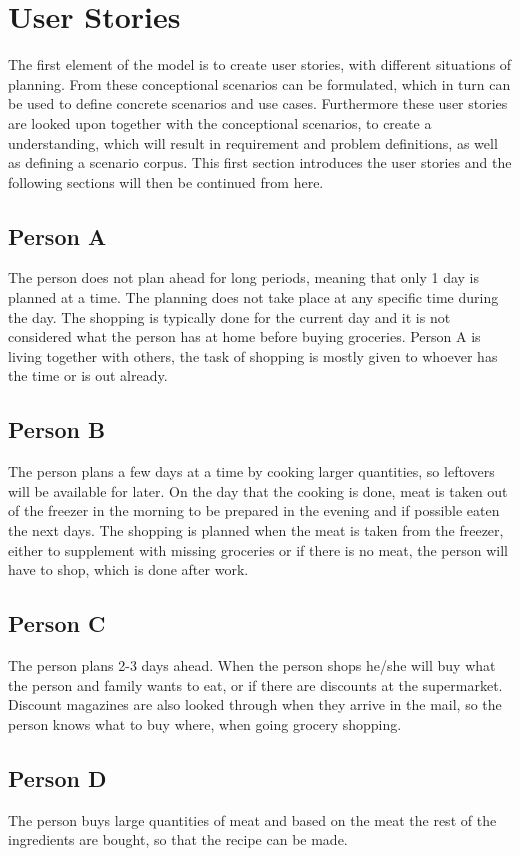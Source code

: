 \section{User Stories} \label{UserStories}
The first element of the model is to create user stories, with different situations of planning. From these conceptional scenarios can be formulated, which in turn can be used to define concrete scenarios and use cases. Furthermore these user stories are looked upon together with the conceptional scenarios, to create a understanding, which will result in requirement and problem definitions, as well as defining a scenario corpus. This first section introduces the user stories and the following sections will then be continued from here.

\subsection{Person A}
The person does not plan ahead for long periods, meaning that only 1 day is planned at a time. The planning does not take place at any specific time during the day. The shopping is typically done for the current day and it is not considered what the person has at home before buying groceries. Person A is living together with others, the task of shopping is mostly given to whoever has the time or is out already.

\subsection{Person B}
The person plans a few days at a time by cooking larger quantities, so leftovers will be available for later. On the day that the cooking is done, meat is taken out of the freezer in the morning to be prepared in the evening and if possible eaten the next days. The shopping is planned when the meat is taken from the freezer, either to supplement with missing groceries or if there is no meat, the person will have to shop, which is done after work.  
 
\subsection{Person C}
The person plans 2-3 days ahead. When the person shops he/she will buy what the person and family wants to eat, or if there are discounts at the supermarket. Discount magazines are also looked through when they arrive in the mail, so the person knows what to buy where, when going grocery shopping.

\subsection{Person D}
The person buys large quantities of meat and based on the meat the rest of the ingredients are bought, so that the recipe can be made.
